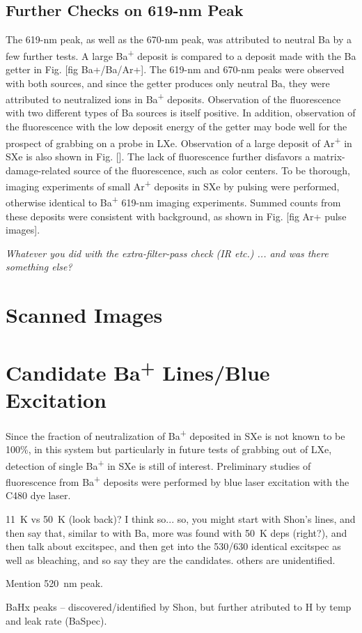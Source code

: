 \subsection{Further Checks on 619-nm Peak}
\label{subsec:619identification}

The 619-nm peak, as well as the 670-nm peak, was attributed to neutral Ba by a few further tests.  A large Ba\textsuperscript{+} deposit is compared to a deposit made with the Ba getter in Fig. [fig Ba+/Ba/Ar+].  The 619-nm and 670-nm peaks were observed with both sources, and since the getter produces only neutral Ba, they were attributed to neutralized ions in Ba\textsuperscript{+} deposits.  Observation of the fluorescence with two different types of Ba sources is itself positive.  In addition, observation of the fluorescence with the low deposit energy of the getter may bode well for the prospect of grabbing on a probe in LXe.  Observation of a large deposit of Ar\textsuperscript{+} in SXe is also shown in Fig. [].  The lack of fluorescence further disfavors a matrix-damage-related source of the fluorescence, such as color centers.  To be thorough, imaging experiments of small Ar\textsuperscript{+} deposits in SXe by pulsing were performed, otherwise identical to Ba\textsuperscript{+} 619-nm imaging experiments.  Summed counts from these deposits were consistent with background, as shown in Fig. [fig Ar+ pulse images].

\emph{\color{gray}Whatever you did with the extra-filter-pass check (IR etc.) ... and was there something else?}


\section{Scanned Images}
\label{sec:scanning}

\section{Candidate Ba\textsuperscript{+} Lines/Blue Excitation}
\label{sec:BaPlus}

Since the fraction of neutralization of Ba\textsuperscript{+} deposited in SXe is not known to be 100\%, in this system but particularly in future tests of grabbing out of LXe, detection of single Ba\textsuperscript{+} in SXe is still of interest.  Preliminary studies of fluorescence from Ba\textsuperscript{+} deposits were performed by blue laser excitation with the C480 dye laser.

11~K vs 50~K (look back)?  I think so... so, you might start with Shon's lines, and then say that, similar to with Ba, more was found with 50~K deps (right?), and then talk about excitspec, and then get into the 530/630 identical excitspec as well as bleaching, and so say they are the candidates.  others are unidentified.

Mention 520~nm peak.

BaHx peaks -- discovered/identified by Shon, but further atributed to H by temp and leak rate (BaSpec).